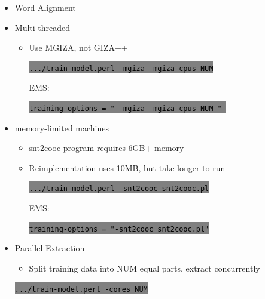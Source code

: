 \documentclass[landscape]{uedslides2C}
\newcommand{\littlecode}[1]{\colorbox{gray}{\textcolor{black}{\small \tt #1}}}
\begin{document}
\begin{itemize} \itemsep -1mm

\item {Word Alignment}
\item {Multi-threaded}
  \begin{itemize}
  \item    Use MGIZA, not GIZA++
  \begin{center}
    \littlecode{.../train-model.perl -mgiza -mgiza-cpus NUM} 
  \end{center}      
  EMS: 
  \begin{center}
    \littlecode{training-options = " -mgiza -mgiza-cpus NUM " } 
  \end{center}      
  \end{itemize}

\item {memory-limited machines}
  \begin{itemize}
  \item snt2cooc program requires 6GB+ memory
  \item Reimplementation uses 10MB, but take longer to run
  \begin{center}
    \littlecode{.../train-model.perl -snt2cooc snt2cooc.pl} 
  \end{center}      
  EMS:
  \begin{center}
    \littlecode{training-options = "-snt2cooc snt2cooc.pl"}
  \end{center}      

  \end{itemize}
\end{itemize}
       


\begin{itemize} \itemsep -1mm

\item {Parallel Extraction}
  \begin{itemize}
  \item Split training data into NUM equal parts, extract concurrently
  \end{itemize}
  \begin{center}
    \littlecode{.../train-model.perl -cores NUM}
  \end{center}      
\end{itemize}

\end{document}
